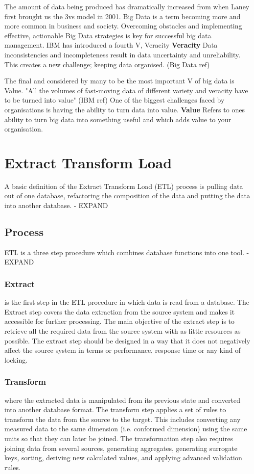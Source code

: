 The amount of data being produced has dramatically increased from when Laney first brought us the 3vs model in 2001. Big Data is a term becoming more and more common in business and society. Overcoming obstacles and implementing effective, actionable Big Data strategies is key for successful big data management. IBM has introduced a fourth V, Veracity \textbf{Veracity} Data inconsistencies and incompleteness result in data uncertainty and unreliability. This creates a new challenge; keeping data organised. (Big Data ref)

The final and considered by many to be the most important V of big data is Value. "All the volumes of fast-moving data of different variety and veracity have to be turned into value" (IBM ref) One of the biggest challenges faced by organisations is having the ability to turn data into value. \textbf{Value} Refers to ones ability to turn big data into something useful and which adds value to your organisation.

\section{Extract Transform Load}\label{etl}
A basic definition of the Extract Transform Load (ETL) process is pulling data out of one database, refactoring the composition of the data and putting the data into another database. - EXPAND

\subsection{Process}
ETL is a three step procedure which combines database functions into one tool. - EXPAND

\subsubsection{Extract} is the first step in the ETL procedure in which data is read from a database. The Extract step covers the data extraction from the source system and makes it accessible for further processing. The main objective of the extract step is to retrieve all the required data from the source system with as little resources as possible. The extract step should be designed in a way that it does not negatively affect the source system in terms or performance, response time or any kind of locking.

\subsubsection{Transform} where the extracted data is manipulated from its previous state and converted into another database format. The transform step applies a set of rules to transform the data from the source to the target. This includes converting any measured data to the same dimension (i.e. conformed dimension) using the same units so that they can later be joined. The transformation step also requires joining data from several sources, generating aggregates, generating surrogate keys, sorting, deriving new calculated values, and applying advanced validation rules.

